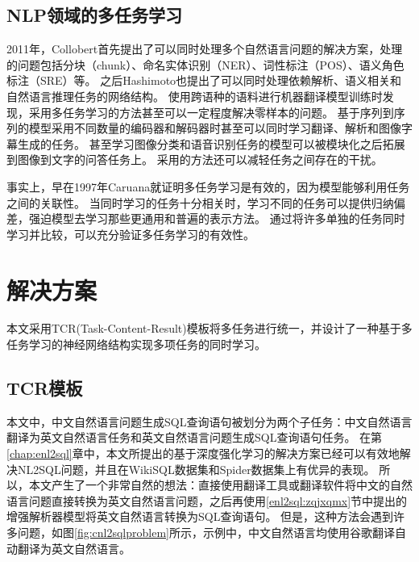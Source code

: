 \subsection{NLP领域的多任务学习}

2011年，Collobert\cite{collobert2011natural}首先提出了可以同时处理多个自然语言问题的解决方案，处理的问题包括分块（chunk）、命名实体识别（NER）、词性标注（POS）、语义角色标注（SRE）等。
之后Hashimoto\cite{hashimoto2017joint}也提出了可以同时处理依赖解析、语义相关和自然语言推理任务的网络结构。
使用跨语种的语料进行机器翻译模型训练时发现，采用多任务学习的方法\cite{johnson2017google}甚至可以一定程度解决零样本的问题。
基于序列到序列的模型采用不同数量的编码器和解码器时\cite{luong2015multi}甚至可以同时学习翻译、解析和图像字幕生成的任务。
甚至学习图像分类和语音识别任务的模型可以被模块化\cite{kaiser2017one}之后拓展到图像到文字的问答任务上\cite{xiong2016dynamic}。
采用\cite{ruder2017learning}的方法还可以减轻任务之间存在的干扰。

事实上，早在1997年Caruana\cite{caruana1997multitask}就证明多任务学习是有效的，因为模型能够利用任务之间的关联性。
当同时学习的任务十分相关时，学习不同的任务可以提供归纳偏差\cite{mitchell1980need}，强迫模型去学习那些更通用和普遍的表示方法。
通过将许多单独的任务同时学习并比较，可以充分验证多任务学习的有效性\cite{wang2018glue,poliak2018evaluation,poliak2018towards}。



\section{解决方案}

本文采用TCR(Task-Content-Result)模板将多任务进行统一，并设计了一种基于多任务学习的神经网络结构实现多项任务的同时学习。

\subsection{TCR模板}

本文中，中文自然语言问题生成SQL查询语句被划分为两个子任务：中文自然语言翻译为英文自然语言任务和英文自然语言问题生成SQL查询语句任务。
在第\ref{chap:enl2sql}章中，本文所提出的基于深度强化学习的解决方案已经可以有效地解决NL2SQL问题，并且在WikiSQL数据集和Spider数据集上有优异的表现。
所以，本文产生了一个非常自然的想法：直接使用翻译工具或翻译软件将中文的自然语言问题直接转换为英文自然语言问题，之后再使用\ref{enl2sql:zqjxqmx}节中提出的增强解析器模型将英文自然语言转换为SQL查询语句。
但是，这种方法会遇到许多问题，如图\ref{fig:cnl2sqlproblem}所示，示例中，中文自然语言均使用谷歌翻译自动翻译为英文自然语言。

